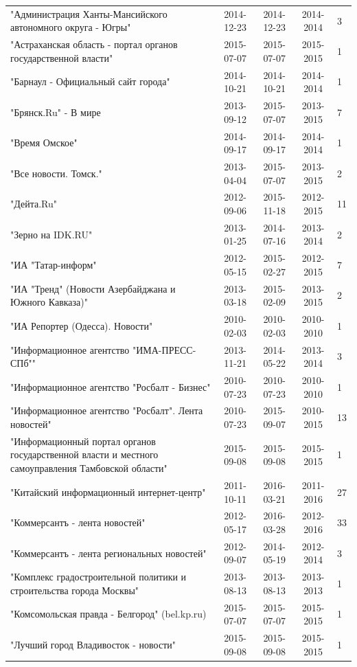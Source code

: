 \begin{longtable}{p{6cm}cccp{2cm}}
"Администрация Ханты-Мансийского автономного округа - Югры" & 2014-12-23 & 2014-12-23 & 2014-2014 & 3\\
"Астраханская область - портал органов государственной власти" & 2015-07-07 & 2015-07-07 & 2015-2015 & 1\\
"Барнаул - Официальный сайт города" & 2014-10-21 & 2014-10-21 & 2014-2014 & 1\\
"Брянск.Ru" - В мире & 2013-09-12 & 2015-07-07 & 2013-2015 & 7\\
"Время Омское" & 2014-09-17 & 2014-09-17 & 2014-2014 & 1\\
"Все новости. Томск." & 2013-04-04 & 2015-07-07 & 2013-2015 & 2\\
"Дейта.Ru" & 2012-09-06 & 2015-11-18 & 2012-2015 & 11\\
"Зерно на IDK.RU" & 2013-01-25 & 2014-07-16 & 2013-2014 & 2\\
"ИА "Татар-информ" & 2012-05-15 & 2015-02-27 & 2012-2015 & 7\\
"ИА "Тренд" (Новости Азербайджана и Южного Кавказа)" & 2013-03-18 & 2015-02-09 & 2013-2015 & 2\\
"ИА Репортер (Одесса). Новости" & 2010-02-03 & 2010-02-03 & 2010-2010 & 1\\
"Информационное агентство "ИМА-ПРЕСС-СПб"" & 2013-11-21 & 2014-05-22 & 2013-2014 & 3\\
"Информационное агентство "Росбалт - Бизнес" & 2010-07-23 & 2010-07-23 & 2010-2010 & 1\\
"Информационное агентство "Росбалт". Лента новостей" & 2010-07-23 & 2015-09-07 & 2010-2015 & 13\\
"Информационный портал органов государственной власти и местного самоуправления Тамбовской области" & 2015-09-08 & 2015-09-08 & 2015-2015 & 1\\
"Китайский информационный интернет-центр" & 2011-10-11 & 2016-03-21 & 2011-2016 & 27\\
"Коммерсантъ - лента новостей" & 2012-05-17 & 2016-03-28 & 2012-2016 & 33\\
"Коммерсантъ - лента региональных новостей" & 2012-09-07 & 2014-05-19 & 2012-2014 & 3\\
"Комплекс градостроительной политики и строительства города Москвы" & 2013-08-13 & 2013-08-13 & 2013-2013 & 1\\
"Комсомольская правда - Белгород" (bel.kp.ru) & 2015-07-07 & 2015-07-07 & 2015-2015 & 1\\
"Лучший город Владивосток - новости" & 2015-09-08 & 2015-09-08 & 2015-2015 & 1\\

\end{longtable}
